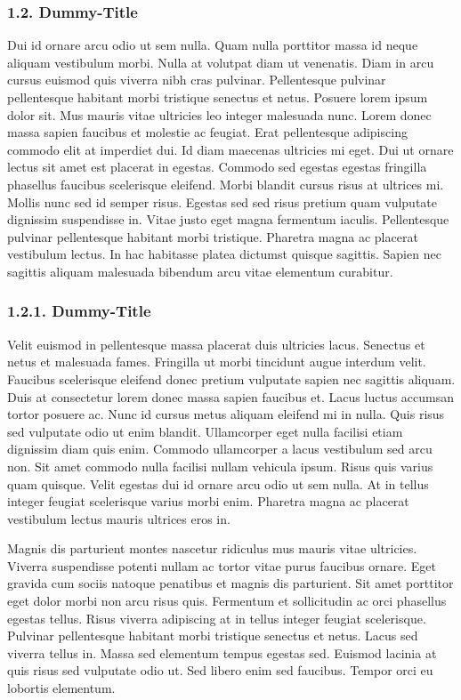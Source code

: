 \documentclass[
]{article}
\begin{document}
\hypertarget{dummy-title-1}{%
\subsubsection{1.2. Dummy-Title}\label{dummy-title-1}}

Dui id ornare arcu odio ut sem nulla. Quam nulla porttitor massa id
neque aliquam vestibulum morbi. Nulla at volutpat diam ut venenatis.
Diam in arcu cursus euismod quis viverra nibh cras pulvinar.
Pellentesque pulvinar pellentesque habitant morbi tristique senectus et
netus. Posuere lorem ipsum dolor sit. Mus mauris vitae ultricies leo
integer malesuada nunc. Lorem donec massa sapien faucibus et molestie ac
feugiat. Erat pellentesque adipiscing commodo elit at imperdiet dui. Id
diam maecenas ultricies mi eget. Dui ut ornare lectus sit amet est
placerat in egestas. Commodo sed egestas egestas fringilla phasellus
faucibus scelerisque eleifend. Morbi blandit cursus risus at ultrices
mi. Mollis nunc sed id semper risus. Egestas sed sed risus pretium quam
vulputate dignissim suspendisse in. Vitae justo eget magna fermentum
iaculis. Pellentesque pulvinar pellentesque habitant morbi tristique.
Pharetra magna ac placerat vestibulum lectus. In hac habitasse platea
dictumst quisque sagittis. Sapien nec sagittis aliquam malesuada
bibendum arcu vitae elementum curabitur.

\hypertarget{dummy-title-2}{%
\subsubsection{1.2.1. Dummy-Title}\label{dummy-title-2}}

Velit euismod in pellentesque massa placerat duis ultricies lacus.
Senectus et netus et malesuada fames. Fringilla ut morbi tincidunt augue
interdum velit. Faucibus scelerisque eleifend donec pretium vulputate
sapien nec sagittis aliquam. Duis at consectetur lorem donec massa
sapien faucibus et. Lacus luctus accumsan tortor posuere ac. Nunc id
cursus metus aliquam eleifend mi in nulla. Quis risus sed vulputate odio
ut enim blandit. Ullamcorper eget nulla facilisi etiam dignissim diam
quis enim. Commodo ullamcorper a lacus vestibulum sed arcu non. Sit amet
commodo nulla facilisi nullam vehicula ipsum. Risus quis varius quam
quisque. Velit egestas dui id ornare arcu odio ut sem nulla. At in
tellus integer feugiat scelerisque varius morbi enim. Pharetra magna ac
placerat vestibulum lectus mauris ultrices eros in.

Magnis dis parturient montes nascetur ridiculus mus mauris vitae
ultricies. Viverra suspendisse potenti nullam ac tortor vitae purus
faucibus ornare. Eget gravida cum sociis natoque penatibus et magnis dis
parturient. Sit amet porttitor eget dolor morbi non arcu risus quis.
Fermentum et sollicitudin ac orci phasellus egestas tellus. Risus
viverra adipiscing at in tellus integer feugiat scelerisque. Pulvinar
pellentesque habitant morbi tristique senectus et netus. Lacus sed
viverra tellus in. Massa sed elementum tempus egestas sed. Euismod
lacinia at quis risus sed vulputate odio ut. Sed libero enim sed
faucibus. Tempor orci eu lobortis elementum.
\end{document}
